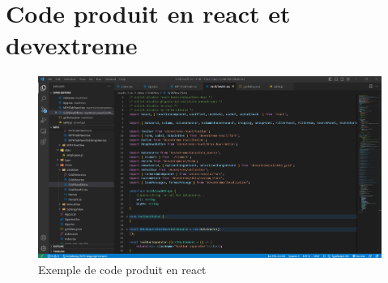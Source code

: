 \documentclass[a4paper, 12pt, french]{article}
\begin{document}
		\section{Code produit en \gls{react} et \gls{devextreme}}\label{appendix:react_code}
			\begin{figure}[h!]
				\begin{center}
					\includegraphics[width=\linewidth]{images/react_code.png}
				\end{center}
				\caption{Exemple de code produit en react}
				\label{fig:react_code}
			\end{figure}
\end{document}
